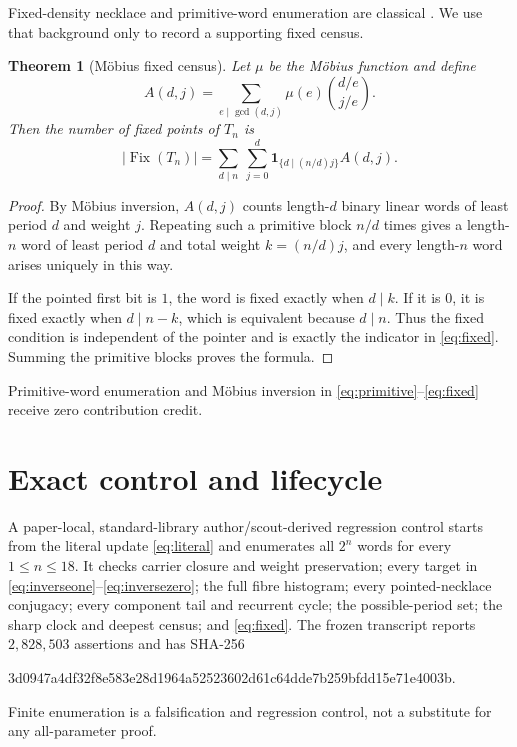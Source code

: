 \documentclass[a4paper,10pt]{amsart}
\newtheorem{theorem}{Theorem}[section]
\theoremstyle{remark}
\newcommand{\Fix}{\operatorname{Fix}}
\newcommand{\1}{\mathbf 1}
\begin{document}
Fixed-density necklace and primitive-word enumeration are classical
\cite{GrosekHromada2016,HeckenbergerSawada2018,Mestrovic2018}.  We use that
background only to record a supporting fixed census.

\begin{theorem}[M\"obius fixed census]\label{thm:fixed}
Let $\mu$ be the M\"obius function and define
\begin{equation}\label{eq:primitive}
 A(d,j)=\sum_{e\mid\gcd(d,j)}\mu(e)
          \binom{d/e}{j/e}.
\end{equation}
Then the number of fixed points of $T_n$ is
\begin{equation}\label{eq:fixed}
 |\Fix(T_n)|=
 \sum_{d\mid n}\ \sum_{j=0}^{d}
 \mathbf1_{\{d\mid(n/d)j\}}A(d,j).
\end{equation}
\end{theorem}

\begin{proof}
By M\"obius inversion, $A(d,j)$ counts length-$d$ binary linear words of
least period $d$ and weight $j$.  Repeating such a primitive block $n/d$
times gives a length-$n$ word of least period $d$ and total weight
$k=(n/d)j$, and every length-$n$ word arises uniquely in this way.

If the pointed first bit is $1$, the word is fixed exactly when $d\mid k$.
If it is $0$, it is fixed exactly when $d\mid n-k$, which is equivalent
because $d\mid n$.  Thus the fixed condition is independent of the pointer
and is exactly the indicator in \eqref{eq:fixed}.  Summing the primitive
blocks proves the formula.
\end{proof}

Primitive-word enumeration and M\"obius inversion in
\eqref{eq:primitive}--\eqref{eq:fixed} receive zero contribution credit.

\section{Exact control and lifecycle}

A paper-local, standard-library author/scout-derived regression control
starts from the literal update
\eqref{eq:literal} and enumerates all $2^n$ words for every $1\leq n\leq18$.
It checks carrier closure and weight preservation; every target in
\eqref{eq:inverseone}--\eqref{eq:inversezero}; the full fibre histogram;
every pointed-necklace conjugacy; every component tail and recurrent cycle;
the possible-period set; the sharp clock and deepest census; and
\eqref{eq:fixed}.  The frozen transcript reports $2{,}828{,}503$ assertions
and has SHA-256
\begin{center}
\small\ttfamily
3d0947a4df32f8e583e28d1964a52523602d61c64dde7b259bfdd15e71e4003b.
\end{center}
Finite enumeration is a falsification and regression control, not a
substitute for any all-parameter proof.
\end{document}
